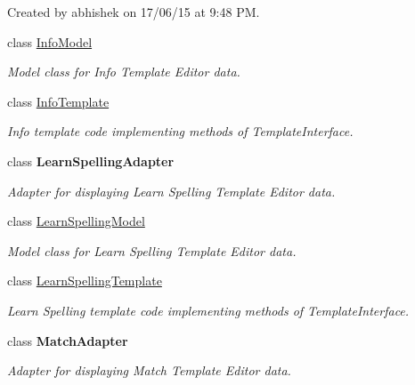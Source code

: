 \begin{DoxyCompactItemize}
\begin{DoxyCompactList}
Created by abhishek on 17/06/15 at 9\+:48 PM. \end{DoxyCompactList}\item 
class \hyperlink{classorg_1_1buildmlearn_1_1toolkit_1_1templates_1_1InfoModel}{Info\+Model}
\begin{DoxyCompactList}\small\item\em Model class for Info Template Editor data. \end{DoxyCompactList}\item 
class \hyperlink{classorg_1_1buildmlearn_1_1toolkit_1_1templates_1_1InfoTemplate}{Info\+Template}
\begin{DoxyCompactList}\small\item\em Info template code implementing methods of Template\+Interface. \end{DoxyCompactList}\item 
class {\bfseries Learn\+Spelling\+Adapter}
\begin{DoxyCompactList}\small\item\em Adapter for displaying Learn Spelling Template Editor data. \end{DoxyCompactList}\item 
class \hyperlink{classorg_1_1buildmlearn_1_1toolkit_1_1templates_1_1LearnSpellingModel}{Learn\+Spelling\+Model}
\begin{DoxyCompactList}\small\item\em Model class for Learn Spelling Template Editor data. \end{DoxyCompactList}\item 
class \hyperlink{classorg_1_1buildmlearn_1_1toolkit_1_1templates_1_1LearnSpellingTemplate}{Learn\+Spelling\+Template}
\begin{DoxyCompactList}\small\item\em Learn Spelling template code implementing methods of Template\+Interface. \end{DoxyCompactList}\item 
class {\bfseries Match\+Adapter}
\begin{DoxyCompactList}\small\item\em Adapter for displaying Match Template Editor data. 


\end{DoxyCompactList}
\end{DoxyCompactItemize}

